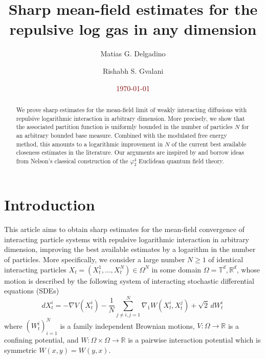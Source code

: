 \documentclass[a4paper,10pt,twoside]{amsart}
\title[Sharp mean-field estimates for the repulsive log gas]{Sharp mean-field estimates for the repulsive log gas in any dimension}
\author[M. G. Delgadino]{Matias G. Delgadino}
\author[R. S. Gvalani]{Rishabh S. Gvalani}
\date{\textcolor{Maroon}{\today}}
\theoremstyle{remark}
\theoremstyle{definition}
\numberwithin{equation}{section}
\newcommand{\T}{\mathbb{T}}
\newcommand{\R}{\mathbb{R}}
\newcommand{\0}{{\bf 0}}
\newcommand{\+}{\hspace{-.5ex}+\hspace{-.5ex}}
\begin{document}
\begin{abstract}
We prove sharp estimates for the mean-field limit of weakly interacting diffusions with repulsive logarithmic interaction in arbitrary dimension. More precisely, we show that the associated partition function is uniformly bounded in the number of particles $N$ for an arbitrary bounded base measure. Combined with the modulated free energy method, this amounts to a logarithmic improvement in $N$ of the current best available closeness estimates in the literature. Our arguments are inspired by and borrow ideas from Nelson's classical construction of the $\varphi^4_2$ Euclidean quantum field theory.
\end{abstract}
\maketitle

\tableofcontents
\section{Introduction} 
This article aims to obtain sharp estimates for the mean-field convergence of interacting particle systems with repulsive logarithmic interaction in arbitrary dimension, improving the best available estimates \cite{BJW1,serfaty2020mean,cai2024propagation} by a logarithm in the number of particles. More specifically, we consider a large number $N \geq 1$ of identical interacting particles $X_t=(X_t^1,\dots,X_t^N) \in \Omega^N$ in some domain $\Omega=\T^d,\R^d$, whose motion is described by the following system of interacting stochastic differential equations (SDEs)
\begin{equation}\label{particles}
    dX_t^i=-\nabla V(X_t^i)-\frac{1}{N}\sum_{j\ne i,j=1}^N \nabla_1 W(X_t^i,X_t^j)+\sqrt{2}\, dW_t^i\,
\end{equation}
where $(W_t^i)_{i=1}^N$ is a family independent Brownian motions,  $V:\Omega\to\R$ is a confining potential, and $W:\Omega\times\Omega\to \R$ is a pairwise interaction potential which is symmetric $W(x,y)=W(y,x)$. 
\end{document}

